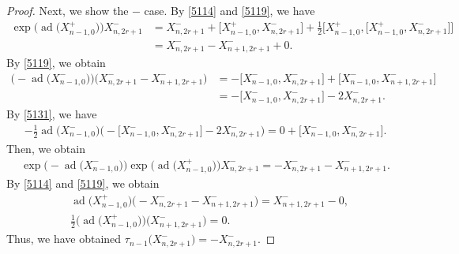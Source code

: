 \documentclass[pdftex]{sigma}
\numberwithin{equation}{section}
\theoremstyle{definition}
\DeclareMathOperator{\ad}{ad}
\begin{document}
\begin{proof}
Next, we show the $-$ case. By \eqref{5114} and \eqref{5119}, we have
\begin{align*}
\exp\bigl(\ad\bigl(X^+_{n-1,0}\bigr)\bigr)X^-_{n,2r+1}&=X^-_{n,2r+1}+\bigl[X^+_{n-1,0},X^-_{n,2r+1}\bigr]+\frac{1}{2}\bigl[X^+_{n-1,0},\bigl[X^+_{n-1,0},X^-_{n,2r+1}\bigr]\bigr]\\
&=X^-_{n,2r+1}-X^-_{n+1,2r+1}+0.
\end{align*}
By \eqref{5119}, we obtain
\begin{align*}
\bigl(-\ad\bigl(X^-_{n-1,0}\bigr)\bigr)\bigl(X^-_{n,2r+1}-X^-_{n+1,2r+1}\bigr)&=-\bigl[X^-_{n-1,0},X^-_{n,2r+1}\bigr]+\bigl[X^-_{n-1,0},X^-_{n+1,2r+1}\bigr]\\
&=-\bigl[X^-_{n-1,0},X^-_{n,2r+1}\bigr]-2X^-_{n,2r+1}.
\end{align*}
By \eqref{5131}, we have
\begin{align*}
-\frac{1}{2}\ad\bigl(X^-_{n-1,0}\bigr)\bigl(-\bigl[X^-_{n-1,0},X^-_{n,2r+1}\bigr]-2X^-_{n,2r+1}\bigr)=0+\bigl[X^-_{n-1,0},X^-_{n,2r+1}\bigr].
\end{align*}
Then, we obtain
\begin{align*}
\exp\bigl(-\ad\bigl(X^-_{n-1,0}\bigr)\bigr)\exp\bigl(\ad\bigl(X^+_{n-1,0}\bigr)\bigr)X^-_{n,2r+1} =-X^-_{n,2r+1}-X^-_{n+1,2r+1}.
\end{align*}
By \eqref{5114} and \eqref{5119}, we obtain
\begin{align*}
& \ad\bigl(X^+_{n-1,0}\bigr)\bigl(-X^-_{n,2r+1}-X^-_{n+1,2r+1}\bigr) =X^-_{n+1,2r+1}-0,
\\
& \frac{1}{2}\bigl(\ad\bigl(X^+_{n-1,0}\bigr)\bigr)\bigl(X^-_{n+1,2r+1}\bigr)=0.
\end{align*}
Thus, we have obtained $\tau_{n-1}\bigl(X^-_{n,2r+1}\bigr)=-X^-_{n,2r+1}$.
\end{proof}
\end{document}
